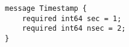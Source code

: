 \begin{Verbatim}[baselinestretch=1,fontsize=\scriptsize]
message Timestamp {
    required int64 sec = 1;
    required int64 nsec = 2;
}
\end{Verbatim}
